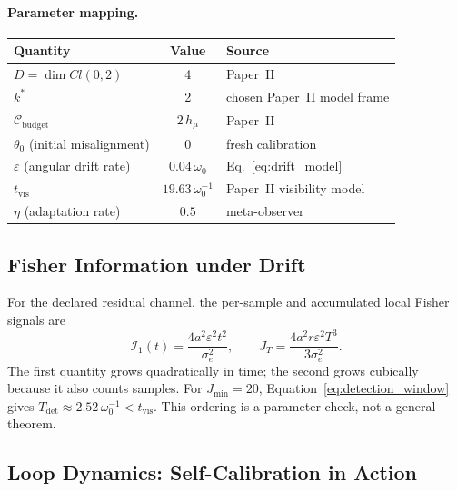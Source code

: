 \documentclass[12pt]{article}
\begin{document}
\paragraph{Parameter mapping.}
\begin{center}
\small
\begin{tabular}{@{}lcl@{}}
\toprule
\textbf{Quantity} & \textbf{Value} & \textbf{Source} \\
\midrule
$D = \dim Cl(0,2)$ & 4 & Paper~II \\
$k^*$ & 2 & chosen Paper~II model frame \\
$\mathcal{C}_{\mathrm{budget}}$ & $2\,h_\mu$ & Paper~II \\
$\theta_0$ (initial misalignment) & 0 & fresh calibration \\
$\varepsilon$ (angular drift rate) & $0.04\,\omega_0$
  & Eq.~\eqref{eq:drift_model} \\
$t_{\mathrm{vis}}$ & $19.63\,\omega_0^{-1}$
  & Paper~II visibility model \\
$\eta$ (adaptation rate) & $0.5$ & meta-observer \\
\bottomrule
\end{tabular}
\end{center}

\subsection{Fisher Information under Drift}
\label{subsec:fisher_drift}

For the declared residual channel, the per-sample and accumulated local
Fisher signals are
\begin{equation}
\label{eq:fisher_qubit}
\mathcal I_1(t)=\frac{4a^2\varepsilon^2t^2}{\sigma_e^2},
\qquad
J_T=\frac{4a^2r\varepsilon^2T^3}{3\sigma_e^2}.
\end{equation}
The first quantity grows quadratically in time; the second grows
cubically because it also counts samples.  For $J_{\min}=20$,
Equation~\eqref{eq:detection_window} gives
$T_{\mathrm{det}}\approx2.52\,\omega_0^{-1}<t_{\mathrm{vis}}$.
This ordering is a parameter check, not a general theorem.

\subsection{Loop Dynamics: Self-Calibration in Action}
\label{subsec:loop_dynamics}
\end{document}
